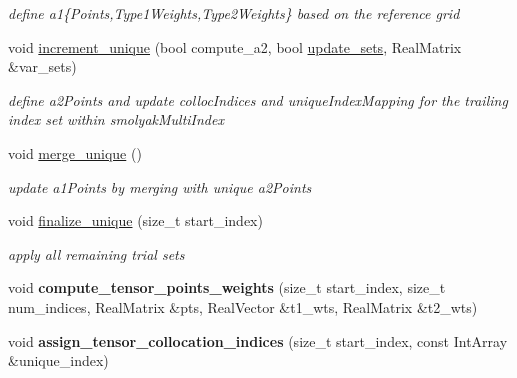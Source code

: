 \begin{DoxyCompactItemize}
\begin{DoxyCompactList}\small\item\em define a1\{Points,Type1\+Weights,Type2\+Weights\} based on the reference grid \end{DoxyCompactList}\item 
void \hyperlink{classPecos_1_1CombinedSparseGridDriver_a9db275646d76935f312de585cc032b35}{increment\+\_\+unique} (bool compute\+\_\+a2, bool \hyperlink{classPecos_1_1SparseGridDriver_ab1c5960af8466c6878fe3c35996c0ae3}{update\+\_\+sets}, Real\+Matrix \&var\+\_\+sets)\label{classPecos_1_1CombinedSparseGridDriver_a9db275646d76935f312de585cc032b35}

\begin{DoxyCompactList}\small\item\em define a2\+Points and update colloc\+Indices and unique\+Index\+Mapping for the trailing index set within smolyak\+Multi\+Index \end{DoxyCompactList}\item 
void \hyperlink{classPecos_1_1CombinedSparseGridDriver_a2ecf6a601999eb7a74d549013b13608c}{merge\+\_\+unique} ()\label{classPecos_1_1CombinedSparseGridDriver_a2ecf6a601999eb7a74d549013b13608c}

\begin{DoxyCompactList}\small\item\em update a1\+Points by merging with unique a2\+Points \end{DoxyCompactList}\item 
void \hyperlink{classPecos_1_1CombinedSparseGridDriver_a761c43d3fbea96d3ebcd7858d2a796d5}{finalize\+\_\+unique} (size\+\_\+t start\+\_\+index)\label{classPecos_1_1CombinedSparseGridDriver_a761c43d3fbea96d3ebcd7858d2a796d5}

\begin{DoxyCompactList}\small\item\em apply all remaining trial sets \end{DoxyCompactList}\item 
void {\bfseries compute\+\_\+tensor\+\_\+points\+\_\+weights} (size\+\_\+t start\+\_\+index, size\+\_\+t num\+\_\+indices, Real\+Matrix \&pts, Real\+Vector \&t1\+\_\+wts, Real\+Matrix \&t2\+\_\+wts)\label{classPecos_1_1CombinedSparseGridDriver_ac64547311f87edb09b8a2bc32388c716}

\item 
void {\bfseries assign\+\_\+tensor\+\_\+collocation\+\_\+indices} (size\+\_\+t start\+\_\+index, const Int\+Array \&unique\+\_\+index)\label{classPecos_1_1CombinedSparseGridDriver_a7ab034ce9d7a36d88b540cce76bd9282}


\end{DoxyCompactItemize}
